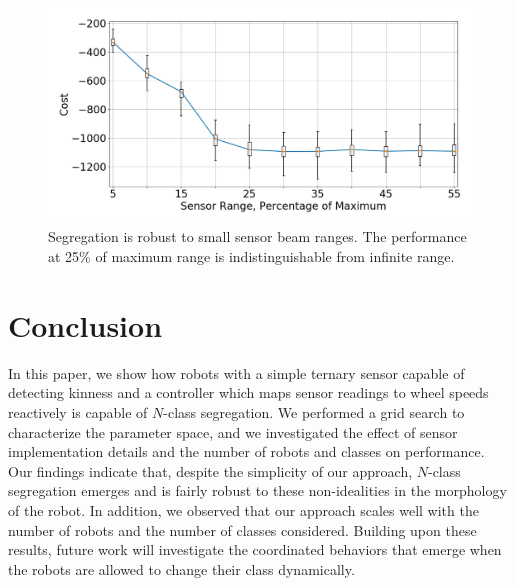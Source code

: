\documentclass[letterpaper, 10 pt, conference]{ieeeconf}
\begin{document}
\begin{figure}[t]
  \centering
  \includegraphics[width=0.9\linewidth]{./images/beam_length}
  \caption{Segregation is robust to small sensor beam ranges. The performance at
    25\% of maximum range is indistinguishable from infinite range.}
  \label{fig:beam_range}
\end{figure}

\section{Conclusion}

In this paper, we show how robots with a simple ternary sensor capable of
detecting kinness and a controller which maps sensor readings to wheel speeds
reactively is capable of $N$-class segregation. We performed a grid search to
characterize the parameter space, and we investigated the effect of sensor
implementation details and the number of robots and classes on performance. Our
findings indicate that, despite the simplicity of our approach, $N$-class
segregation emerges and is fairly robust to these non-idealities in the
morphology of the robot. In addition, we observed that our approach scales well
with the number of robots and the number of classes considered. Building upon
these results, future work will investigate the coordinated behaviors that
emerge when the robots are allowed to change their class dynamically.



\end{document}
